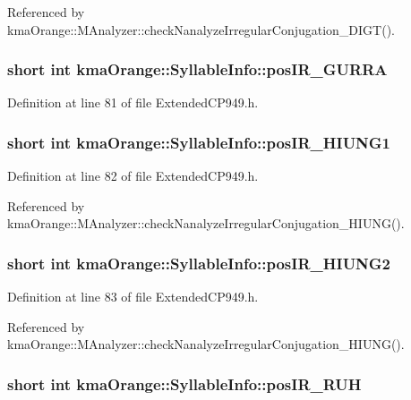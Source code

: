 Referenced by kmaOrange::MAnalyzer::checkNanalyzeIrregularConjugation\_\-DIGT().\hypertarget{structkmaOrange_1_1SyllableInfo_4b90a34881329d4e7ad4cad0bb930101}{
\subsubsection[{posIR\_\-GURRA}]{\setlength{\rightskip}{0pt plus 5cm}short int {\bf kmaOrange::SyllableInfo::posIR\_\-GURRA}}}
\label{structkmaOrange_1_1SyllableInfo_4b90a34881329d4e7ad4cad0bb930101}




Definition at line 81 of file ExtendedCP949.h.\hypertarget{structkmaOrange_1_1SyllableInfo_2831622547e8f4e2523b9919a27fb9ec}{
\subsubsection[{posIR\_\-HIUNG1}]{\setlength{\rightskip}{0pt plus 5cm}short int {\bf kmaOrange::SyllableInfo::posIR\_\-HIUNG1}}}
\label{structkmaOrange_1_1SyllableInfo_2831622547e8f4e2523b9919a27fb9ec}




Definition at line 82 of file ExtendedCP949.h.

Referenced by kmaOrange::MAnalyzer::checkNanalyzeIrregularConjugation\_\-HIUNG().\hypertarget{structkmaOrange_1_1SyllableInfo_38fae0187a8ba6130f21c89bf0ab6d48}{
\subsubsection[{posIR\_\-HIUNG2}]{\setlength{\rightskip}{0pt plus 5cm}short int {\bf kmaOrange::SyllableInfo::posIR\_\-HIUNG2}}}
\label{structkmaOrange_1_1SyllableInfo_38fae0187a8ba6130f21c89bf0ab6d48}




Definition at line 83 of file ExtendedCP949.h.

Referenced by kmaOrange::MAnalyzer::checkNanalyzeIrregularConjugation\_\-HIUNG().\hypertarget{structkmaOrange_1_1SyllableInfo_3999fedd6625cb23e89dce860769defb}{
\subsubsection[{posIR\_\-RUH}]{\setlength{\rightskip}{0pt plus 5cm}short int {\bf kmaOrange::SyllableInfo::posIR\_\-RUH}}}
\label{structkmaOrange_1_1SyllableInfo_3999fedd6625cb23e89dce860769defb}




